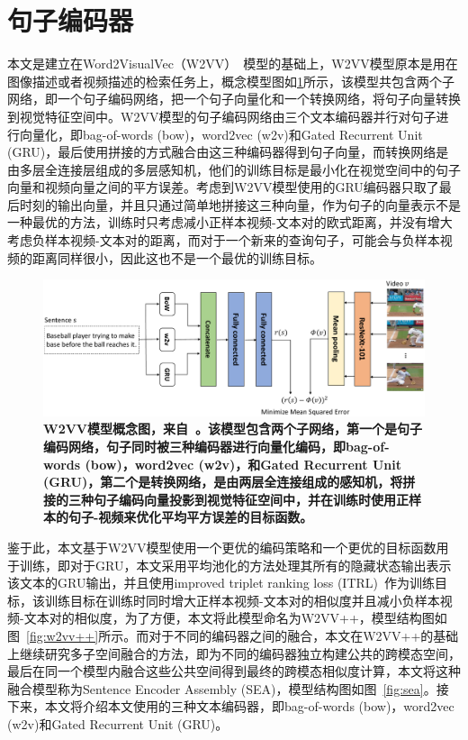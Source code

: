 \section{句子编码器}
本文是建立在Word2VisualVec（W2VV）~\cite{dong2018predicting}模型的基础上，W2VV模型原本是用在图像描述或者视频描述的检索任务上，概念模型图如\ref{fig:base-w2vv}所示，该模型共包含两个子网络，即一个句子编码网络，把一个句子向量化和一个转换网络，将句子向量转换到视觉特征空间中。W2VV模型的句子编码网络由三个文本编码器并行对句子进行向量化，即bag-of-words (bow)，word2vec (w2v)和Gated Recurrent Unit (GRU)，最后使用拼接的方式融合由这三种编码器得到句子向量，而转换网络是由多层全连接层组成的多层感知机，他们的训练目标是最小化在视觉空间中的句子向量和视频向量之间的平方误差。考虑到W2VV模型使用的GRU编码器只取了最后时刻的输出向量，并且只通过简单地拼接这三种向量，作为句子的向量表示不是一种最优的方法，训练时只考虑减小正样本视频-文本对的欧式距离，并没有增大考虑负样本视频-文本对的距离，而对于一个新来的查询句子，可能会与负样本视频的距离同样很小，因此这也不是一个最优的训练目标。
\begin{figure}[tbh!]
    \centering
    \includegraphics[width=\linewidth]{figures/w2vv-model}
    \caption[Dong等人~\cite{dong2018predicting}提出的W2VV模型的概念图]{\textbf{W2VV模型概念图，来自~\cite{li2017multi}。该模型包含两个子网络，第一个是句子编码网络，句子同时被三种编码器进行向量化编码，即bag-of-words (bow)，word2vec (w2v)，和Gated Recurrent Unit (GRU)，第二个是转换网络，是由两层全连接组成的感知机，将拼接的三种句子编码向量投影到视觉特征空间中，并在训练时使用正样本的句子-视频来优化平均平方误差的目标函数。}}
    \label{fig:base-w2vv}
\end{figure}

鉴于此，本文基于W2VV模型使用一个更优的编码策略和一个更优的目标函数用于训练，即对于GRU，本文采用平均池化的方法处理其所有的隐藏状态输出表示该文本的GRU输出，并且使用improved triplet ranking loss (ITRL)~\cite{faghri2017vse++}作为训练目标，该训练目标在训练时同时增大正样本视频-文本对的相似度并且减小负样本视频-文本对的相似度，为了方便，本文将此模型命名为W2VV++，模型结构图如图~\ref{fig:w2vv++}所示。而对于不同的编码器之间的融合，本文在W2VV++的基础上继续研究多子空间融合的方法，即为不同的编码器独立构建公共的跨模态空间，最后在同一个模型内融合这些公共空间得到最终的跨模态相似度计算，本文将这种融合模型称为Sentence Encoder Assembly (SEA)，模型结构图如图~\ref{fig:sea}。接下来，本文将介绍本文使用的三种文本编码器，即bag-of-words (bow)，word2vec (w2v)和Gated Recurrent Unit (GRU)。

